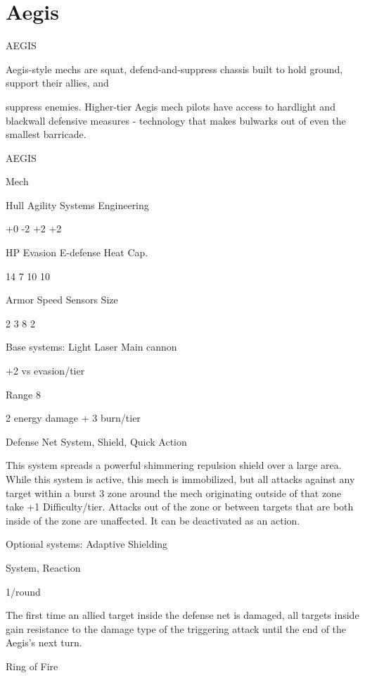 \section{Aegis}

                                                 AEGIS  

Aegis-style mechs are squat, defend-and-suppress chassis built to hold ground, support their allies, and  

suppress enemies. Higher-tier Aegis mech pilots have access to hardlight and blackwall defensive  
measures - technology that makes bulwarks out of even the smallest barricade.   

 AEGIS 

 Mech 

 Hull       Agility      Systems       Engineering 

 +0         -2           +2            +2 

 HP         Evasion      E-defense     Heat Cap. 

 14         7            10            10 

 Armor      Speed        Sensors       Size 

 2          3            8             2 

Base systems:  
Light Laser  
Main cannon
 
+2 vs evasion/tier
 
Range 8
 
2 energy damage + 3 burn/tier
 

Defense Net  
System, Shield, Quick Action
 
This system spreads a powerful shimmering repulsion shield over a large area. While this system  
is active, this mech is immobilized, but all attacks against any target within a burst 3 zone around  
the mech originating outside of that zone take +1 Difficulty/tier. Attacks out of the zone or  
between targets that are both inside of the zone are unaffected. It can be deactivated as an  
action.
 

Optional systems:  
Adaptive Shielding
 
System, Reaction
 
1/round
 
The first time an allied target inside the defense net is damaged, all targets inside gain resistance  
to the damage type of the triggering attack until the end of the Aegis’s next turn.
 

Ring of Fire
 

